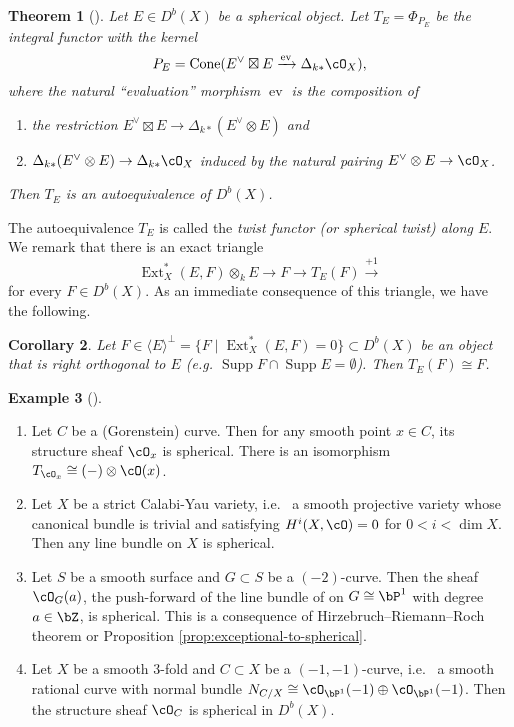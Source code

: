 \documentclass{amsart}
\numberwithin{equation}{section}
\theoremstyle{plain}
\newtheorem{theorem}{Theorem}[section]
\newtheorem{corollary}[theorem]{Corollary}
\theoremstyle{definition}
\newtheorem{example}[theorem]{Example}
\DeclareMathOperator{\Cone}{\mathrm{Cone}}
\DeclareMathOperator{\ev}{\mathrm{ev}}
\DeclareMathOperator{\Supp}{\mathrm{Supp}}
\DeclareMathOperator{\Ext}{\mathrm{Ext}}
\begin{document}
\begin{theorem}[{\cite{MR1831820}}]
    Let $E \in D^b(X)$ be a spherical object.
    Let $T_E = \Phi_{P_E}$ be the integral functor with the kernel
    \begin{equation}
        P_E = \Cone(E^\vee \boxtimes E \xrightarrow{\ev} \Delta_{k*}\cO_X),
    \end{equation}
    where the natural ``evaluation'' morphism $\ev$ is the composition of
    \begin{enumerate}
        \item the restriction $E^\vee \boxtimes E \to \Delta_{k*}(E^\vee \otimes E)$ and
        \item $\Delta_{k*}(E^\vee \otimes E) \to \Delta_{k*}\cO_X$ induced by the natural pairing $E^\vee \otimes E \to \cO_X$.
    \end{enumerate}
    Then $T_E$ is an autoequivalence of $D^b(X)$.
\end{theorem}
The autoequivalence $T_E$ is called the \emph{twist functor (or spherical twist) along $E$}.
We remark that there is an exact triangle
\begin{equation}
    \Ext^*_X(E, F)\otimes_k E \to F \to T_E(F) \xrightarrow{+1}
\end{equation}
for every $F \in D^b(X)$.
As an immediate consequence of this triangle, we have the following.
\begin{corollary}\label{cor:orthogonal-to-spherical}
    Let $F \in \langle E \rangle^\perp = \{F \mid \Ext^*_X(E, F) = 0\} \subset D^b(X)$ be an object that is right orthogonal to $E$ (e.g. $\Supp F \cap \Supp E = \emptyset$).
    Then $T_E(F) \cong F$.
\end{corollary}
\begin{example}[{\cite{MR1831820}}]\label{ex:spherical-objects}
    \begin{enumerate}
        \item Let $C$ be a (Gorenstein) curve. Then for any smooth point $x \in C$, its structure sheaf $\cO_x$ is spherical. There is an isomorphism $T_{\cO_x} \cong (-) \otimes \cO(x)$.
        \item Let $X$ be a strict Calabi-Yau variety, i.e.~ a smooth projective variety whose canonical bundle is trivial and satisfying $H^i(X, \cO)=0$ for $0 < i < \dim X$. Then any line bundle on $X$ is spherical.
        \item Let $S$ be a smooth surface and $G \subset S$ be a $(-2)$-curve. Then the sheaf $\cO_G(a)$, the push-forward of the line bundle of on $G \cong \bP^1$ with degree $a \in \bZ$, is spherical. This is a consequence of Hirzebruch--Riemann--Roch theorem or Proposition \ref{prop:exceptional-to-spherical}.
        \item Let $X$ be a smooth $3$-fold and $C \subset X$ be a $(-1, -1)$-curve, i.e.~ a smooth rational curve with normal bundle $N_{C/X} \cong \cO_{\bP^1}(-1)\oplus\cO_{\bP^1}(-1)$. Then the structure sheaf $\cO_C$ is spherical in $D^b(X)$.
    \end{enumerate}
\end{example}
\end{document}
